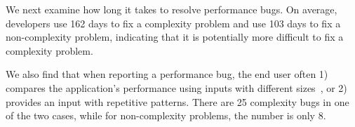 


We next examine how long it takes to resolve performance bugs. 
On average, developers use 162 days to fix a 
complexity problem and use 103 days to fix a non-complexity problem, 
indicating that it is potentially more difficult to fix a complexity problem.


We also find that 
when reporting a performance bug, the end user often 
1) compares the application's performance 
using inputs with different sizes~\cite{SongOOPSLA2014}, 
or 2) provides an input with repetitive patterns. 
There are 25 complexity bugs in one of the two cases, 
while for non-complexity problems, the number is only 8.



